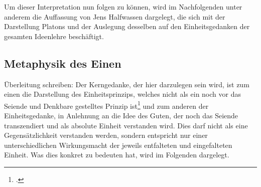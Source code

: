 Um dieser Interpretation nun folgen zu können, wird im Nachfolgenden unter anderem die Auffassung von Jens Halfwassen dargelegt, die sich mit der Darstellung Platons und der Auslegung desselben auf den Einheitsgedanken der gesamten Ideenlehre beschäftigt.


\subsection{Metaphysik des Einen}
{\color{red}Überleitung schreiben:
Der Kerngedanke, der hier darzulegen sein wird, ist zum einen die Darstellung des Einheitsprinzips, welches nicht als ein noch vor das Seiende und Denkbare gestelltes Prinzip ist\footcite[vgl.][S.99]{halfwassen2015spuren} und zum anderen der Einheitsgedanke, in Anlehnung an die Idee des Guten, der noch das Seiende transzendiert und als absolute Einheit verstanden wird. Dies darf nicht als eine Gegensätzlichkeit verstanden werden, sondern entspricht nur einer unterschiedlichen Wirkungsmacht der jeweils entfalteten und eingefalteten Einheit. Was dies konkret zu bedeuten hat, wird im Folgenden dargelegt.}

